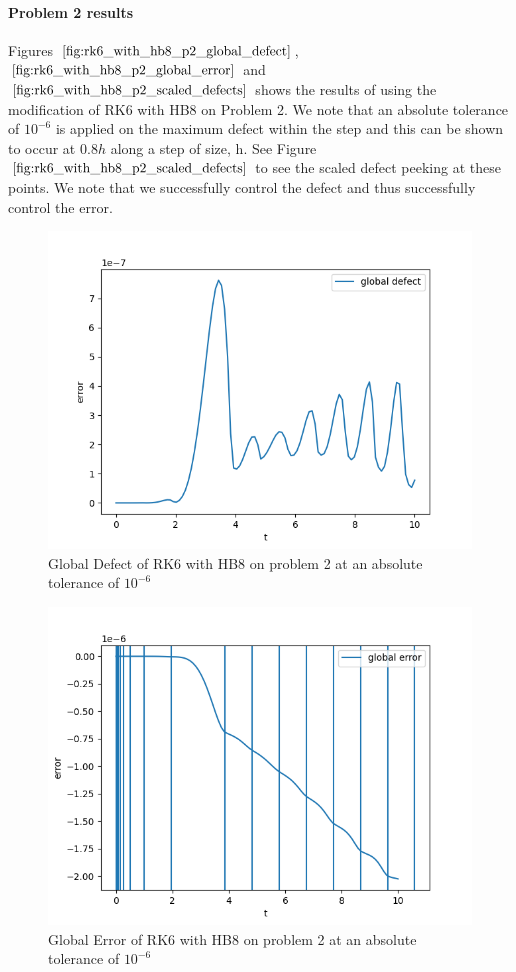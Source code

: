 \documentclass{article}
\begin{document}
\paragraph{Problem 2 results}
Figures $\ref{fig:rk6_with_hb8_p2_global_defect}$, $\ref{fig:rk6_with_hb8_p2_global_error}$ and $\ref{fig:rk6_with_hb8_p2_scaled_defects}$ shows the results of using the modification of RK6 with HB8 on Problem 2. We note that an absolute tolerance of $10^{-6}$ is applied on the maximum defect within the step and this can be shown to occur at $0.8h$ along a step of size, h. See Figure $\ref{fig:rk6_with_hb8_p2_scaled_defects}$ to see the scaled defect peeking at these points. We note that we successfully control the defect and thus successfully control the error.

\begin{figure}[H]
\centering
\includegraphics[width=0.7\linewidth]{./figures/rk6_with_hb8_p2_global_defect}
\caption{Global Defect of RK6 with HB8 on problem 2 at an absolute tolerance of $10^{-6}$}
\label{fig:rk6_with_hb8_p2_global_defect}
\end{figure}

\begin{figure}[H]
\centering
\includegraphics[width=0.7\linewidth]{./figures/rk6_with_hb8_p2_global_error}
\caption{Global Error of RK6 with HB8 on problem 2 at an absolute tolerance of $10^{-6}$}
\label{fig:rk6_with_hb8_p2_global_error}
\end{figure}
\end{document}
